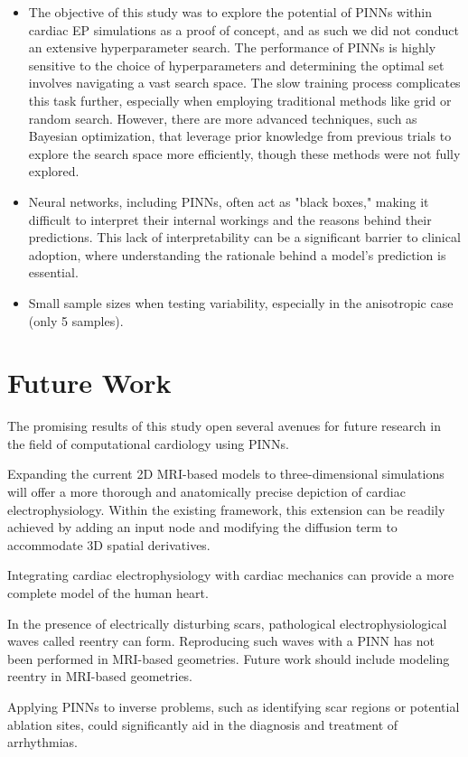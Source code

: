 \begin{itemize}
\item The objective of this study was to explore the potential of PINNs within cardiac EP simulations as a proof of concept, and as such we did not conduct an extensive hyperparameter search. The performance of PINNs is highly sensitive to the choice of hyperparameters and determining the optimal set involves navigating a vast search space. The slow training process complicates this task further, especially when employing traditional methods like grid or random search. However, there are more advanced techniques, such as Bayesian optimization, that leverage prior knowledge from previous trials to explore the search space more efficiently, though these methods were not fully explored.
\item Neural networks, including PINNs, often act as "black boxes," making it difficult to interpret their internal workings and the reasons behind their predictions. This lack of interpretability can be a significant barrier to clinical adoption, where understanding the rationale behind a model's prediction is essential. 
\item Small sample sizes when testing variability, especially in the anisotropic case (only 5 samples).
\end{itemize}

\section{Future Work}
The promising results of this study open several avenues for future research in the field of computational cardiology using PINNs.

Expanding the current 2D MRI-based models to three-dimensional simulations will offer a more thorough and anatomically precise depiction of cardiac electrophysiology. Within the existing framework, this extension can be readily achieved by adding an input node and modifying the diffusion term to accommodate 3D spatial derivatives.

Integrating cardiac electrophysiology with cardiac mechanics can provide a more complete model of the human heart.

In the presence of electrically disturbing scars, pathological electrophysiological waves called reentry can form. Reproducing such waves with a PINN has not been performed in MRI-based geometries. Future work should include modeling reentry in MRI-based geometries.

Applying PINNs to inverse problems, such as identifying scar regions or potential ablation sites, could significantly aid in the diagnosis and treatment of arrhythmias.
